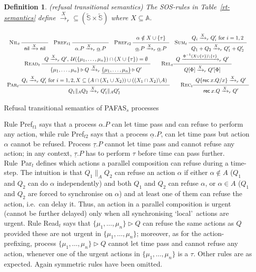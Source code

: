 \documentclass[copyright,creativecommons]{eptcs}
\newtheorem{definition}[theorem]{Definition}
\def\name#1{\mbox{\sc #1}}
\def\sos#1#2{{\def\arraystretch{1.6}\begin{array}{c}#1\\\hline
#2\end{array}}}
\newcommand{\Nil}{{\sf nil}}
\newcommand{\rec}{{\sf rec} \:}
\newcommand{\nar}[2]{\xrightarrow{#1}_{#2}}
\newcommand{\ur}{{\cal U}}
\newcommand{\B}{{\mathbb A}} \newcommand{\Bt}{\B_{\tau}} \newcommand{\X}{{\cal X}}
\newcommand{\Sg}{\tilde{\SG}}
\newcommand{\SG}{{\mathbb S}}
\newcommand{\rop}{\triangleright}
\begin{document}
\begin{definition}\label{PAFASRT}\rm ({\em refusal transitional semantics})
The SOS-rules in Table~\ref{rt-semantics} define $\nar{X}{r} \subseteq (\Sg
\times \Sg)$ where $X \subseteq \B$.
\end{definition}
\begin{table}[tbh]
\small
\[
\begin{array}{c}
\name{Nil$_{t}$}\; \sos{}{\Nil \nar{X}{} \Nil}\quad
\name{Pref$_{t1}$}\; \sos{}{\alpha.P \nar{X}{r}
\underline{\alpha}.P}\quad
\name{Pref$_{t2}$}\; \sos{\alpha \notin X \cup \{\tau\}}
{\underline{\alpha}.P \nar{X}{r} \underline{\alpha}.P} \quad
\name{Sum$_{t}$}\; \sos{Q_i\nar{X}{r}Q'_i \mbox{ for }
i=1,2}{Q_1+Q_2 \nar{X}{r} Q'_1 + Q'_2} \\
\name{Read$_{t}$}\; \sos{Q \nar{X}{r} Q', \; \ur(\{\mu_1, \ldots,
\mu_n\} ) \cap (X \cup \{\tau\}) = \emptyset}
{\{\mu_1, \ldots, \mu_n\} \rop Q \nar{X}{r}
\underline{\{\mu_1, \ldots, \mu_n\}} \rop Q'} \qquad
\name{Rel$_{t}$} \sos{Q\nar{\Phi^{-1}(X \cup \{\tau\})\backslash
\{\tau\}}{r}Q'} {Q[\Phi]\nar{X}{r}Q'[\Phi]}\\
\name{Par$_{t}$} \sos{Q_i \nar{X}{r} Q'_i \mbox{ for } i=1,2, X
\subseteq (A \cap (X_1 \cup X_2)) \cup ((X_1 \cap X_2)\backslash A)}
{Q_1\|_A Q_2 \nar{X}{r} Q'_1\|_A Q'_2} \qquad
\name{Rec$_t$} \sos{Q\{\rec x.Q/x\} \nar{X}{r} Q'}{ \rec x.Q \nar{X}{r}
Q'}\\
\end{array}\]
\caption{Refusal transitional semantics of PAFAS$_s$ processes}
\label{rt-semantics}
\end{table}
Rule \name{Pref$_{t1}$} says that a process $\alpha.P$ can let time pass
and can refuse to perform any action, while rule \name{Pref$_{t2}$} says
that a process $\underline{\alpha}.P$, can let time pass but action
$\alpha$ cannot be refused. Process $\underline{\tau}.P$ cannot let time
pass and cannot refuse any action; in any context, $\underline{\tau}.P$ has
to perform $\tau$ before time can pass further. Rule~\name{Par$_{t}$}
defines which actions a parallel composition can refuse during a time-step.
The intuition is that $Q_1 \|_A Q_2$ can refuse an action $\alpha$ if
either $\alpha \notin A$ ($Q_1$ and $Q_2$ can do $\alpha$ independently)
and both $Q_1$ and $Q_2$ can refuse $\alpha$, or $\alpha \in A$ ($Q_1$ and
$Q_2$ are forced to synchronise on $\alpha$) and at least one of them can
refuse the action, i.e.\ can delay it. Thus, an action in a parallel
composition is urgent (cannot be further delayed) only when all
synchronising \lq local\rq\ actions are urgent. Rule \name{Read$_{t}$}
says that $\{\mu_1, \ldots, \mu_n\} \rop Q$ can refuse the same actions as
$Q$ provided these are not urgent in $\{\mu_1, \ldots, \mu_n\}$;
moreover, as for the action-prefixing,  process $\{\mu_1, \ldots, \mu_n\}
\rop Q$ cannot let time pass and cannot refuse any action,  whenever one
of the urgent actions in $\{\mu_1, \ldots, \mu_n\}$ is a $\tau$. Other
rules are as expected. Again symmetric rules have been omitted.
\end{document}
